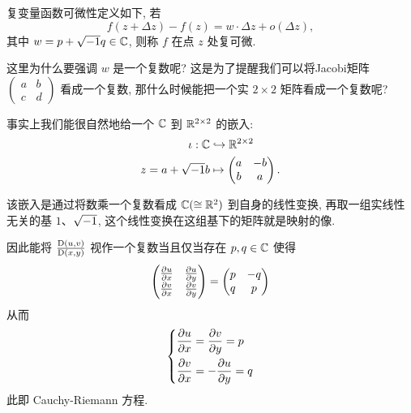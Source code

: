             复变量函数可微性定义如下, 若
            \begin{equation*}\label{C-differential}
                f(z+\Delta z)-f(z) = w\cdot\Delta z+o(\Delta z),
            \end{equation*}
            其中 $w=p+\sqrt{-1} q\in\mathbb{C}$, 则称 $f$ 在点 $z$ 处复可微.
            
            这里为什么要强调 $w$ 是一个复数呢? 这是为了提醒我们可以将Jacobi矩阵 $
            \begin{pmatrix}
                a & b \\
                c & d
            \end{pmatrix}$ 看成一个复数, 那什么时候能把一个实 $2\times2$ 矩阵看成一个复数呢?

            事实上我们能很自然地给一个 $\mathbb{C}$ 到 $\mathbb{R}^{2\times2}$ 的嵌入:
            \begin{equation*}
                \begin{aligned}
                    \iota:\mathbb{C} &   \hookrightarrow\mathbb{R}^{2\times2} \\
                    z = a+\sqrt{-1} b &   \mapsto
                    \begin{pmatrix}
                        a & -b \\
                        b & a
                    \end{pmatrix}.
                \end{aligned}
            \end{equation*}
            \begin{remark}
                该嵌入是通过将数乘一个复数看成 $\mathbb{C}(\cong\mathbb{R}^2)$ 到自身的线性变换, 再取一组实线性无关的基 $1$、$\sqrt{-1}$, 
                这个线性变换在这组基下的矩阵就是映射的像.
            \end{remark}
            因此能将 $\frac{{\rm D}(u,v)}{{\rm D}(x,y)}$ 视作一个复数当且仅当存在 $p,q\in\mathbb{C}$ 使得
            \begin{equation*}
                \begin{pmatrix} \frac{\partial u}{\partial x} & \frac{\partial u}{\partial y} \\ \frac{\partial v}{\partial x} & \frac{\partial v}{\partial y} \end{pmatrix} = 
                \begin{pmatrix} p & -q \\ q & p \end{pmatrix}
            \end{equation*}
            从而
            \begin{equation*}
                \left\{
                    \begin{aligned}
                        \frac{\partial u}{\partial x} &= \frac{\partial v}{\partial y} = p \\
                        \frac{\partial v}{\partial x} &= -\frac{\partial u}{\partial y} = q
                    \end{aligned}
                \right.
            \end{equation*}
            此即 Cauchy-Riemann 方程.

